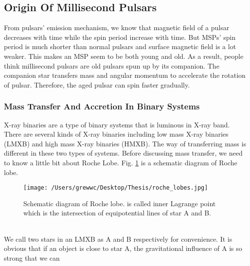 \documentclass[12pt]{report}
\begin{document}
        \subsection{Origin Of Millisecond Pulsars}
            From pulsars' emission mechanism, we know that magnetic field of a pulsar decreases with time while 
            the spin period increase with time. But MSPs' spin period is much shorter than normal pulsars and 
            surface magnetic field is a lot weaker. This makes an MSP seem to be both young and old. As a result,
            people think millisecond pulsars are old pulsars spun up by its companion. The companion star transfers
            mass and angular momentum to accelerate the rotation of pulsar. 
            Therefore, the aged pulsar can spin faster gradually. 
            \subsubsection{Mass Transfer And Accretion In Binary Systems}
                X-ray binaries are a type of binary systems that is luminous in X-ray band. There are several kinds 
                of X-ray binaries including low mass X-ray binaries (LMXB) and high mass X-ray binaries (HMXB). 
                The way of transferring mass is different in these two types of systems. Before discussing mass 
                transfer, we need to know a little bit about Roche Lobe. Fig. \ref{fig:roche lobe} is a 
                schematic diagram of Roche lobe.
                \begin{figure}[h]
                  \centering
                  \texttt{[image: /Users/grewwc/Desktop/Thesis/roche\_lobes.jpg]}
                  
                  \caption{Schematic diagram of Roche lobe. is called inner 
                            Lagrange point which is the intersection of equipotential lines of star A 
                            and B.}
                  \label{fig:roche lobe}
                \end{figure}\\
                \indent  We call two stars in an LMXB as A and B respectively for convenience. It is obvious 
                that if an object is close to star A, the gravitational influence of A is so strong that we can 
\end{document}
